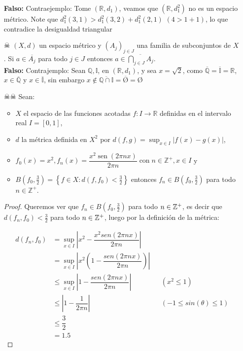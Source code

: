 \begin{itemize}
    \textbf{Falso: }Contraejemplo: Tome $(\mathbb{R},d_1)$, veamos que $(\mathbb{R},d_1^2)$ no es un espacio métrico. Note que $d_1^2(3,1)>d_1^2(3,2)+d_1^2(2,1)$ $(4>1+1)$, lo que contradice la desigualdad triangular
    
    \item[☠]$(X, d)$ un espacio métrico y $\left(A_j\right)_{j \in J}$ una familia de subconjuntos de $X$. Si $a \in \overline{A_j}$ para todo $j \in J$ entonces $a \in \overline{\bigcap_{j \in J} A_j}$.\\
    
    \textbf{Falso: }Contrajemplo: Sean $\mathbb{Q}, \mathbb{I}$, en $(\mathbb{R},d_1)$, y sea $x=\sqrt{2}$, como $\overline{\mathbb{Q}}=\overline{\mathbb{I}}=\mathbb{R}$, $x \in \overline{\mathbb{Q}}$ y $x\in \overline{\mathbb{I}}$, sin embargo $x\not \in \overline{\mathbb{Q}\cap \mathbb{I}}=\overline{\text{\O}}=$\O

    
    \item[☠☠] Sean:
    \begin{itemize}
        
\item $X$ el espacio de las funciones acotadas $f: I \rightarrow \mathbb{R}$ definidas en el intervalo real $I=[0,1]$,

\item $d$ la métrica definida en $X^2$ por $d(f, g)=\sup _{x \in I}|f(x)-g(x)|$,

\item $f_0(x)=x^2, f_n(x)=\dfrac{x^2 \operatorname{sen}(2 \pi n x)}{2 \pi n}                       
    \operatorname{con} n \in \mathbb{Z}^{+}, x \in I$ y

\item $B\left(f_0, \frac{3}{2}\right)=\left\{f \in X: d\left(f, f_0\right)<\frac{3}{2}\right\}$
entonces $f_n \in B\left(f_0, \frac{3}{2}\right)$ para todo $n \in \mathbb{Z}^{+}$.\\

    \end{itemize}
   
 \begin{proof}
    Queremos ver que $f_n\in B(f_0,\frac{3}{2})$ para todo $n \in \mathbb{Z}^+$, es decir que $d(f_n,f_0)<\frac{3}{2}$ para todo $n \in \mathbb{Z}^+$, luego por la definición de la métrica:
    
    \begin{align*}
        d(f_n,f_0)&=\sup_{x \in I}\left|x^2-\dfrac{x^2sen(2\pi nx)}{2\pi n}\right|\\
        &=\sup_{x \in I}\left|x^2\left(1-\dfrac{sen(2\pi nx)}{2\pi n}\right)\right|\\
        &\leq\sup_{x \in I}\left|1-\dfrac{sen(2\pi nx)}{2\pi n}\right| && (x^2\leq 1)\\
        &\leq\left|1-\dfrac{1}{2\pi n}\right|&&(-1\leq sin(\theta)\leq 1)\\
        &\leq \dfrac{3}{2}\\
        &=1.5
     \end{align*}


\end{proof}
\end{itemize}
